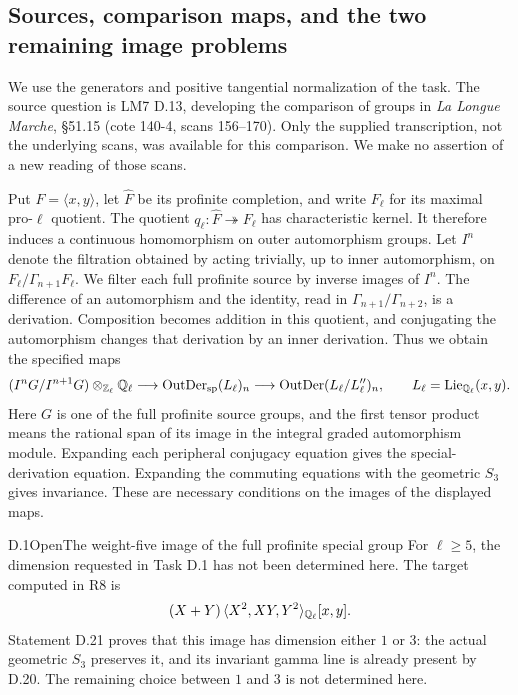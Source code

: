 \subsection{Sources, comparison maps, and the two remaining image problems}

We use the generators and positive tangential normalization of the task.
The source question is LM7 D.13, developing the comparison of groups in
\emph{La Longue Marche}, \S51.15 (cote 140-4, scans 156--170).
Only the supplied transcription, not the underlying scans, was available
for this comparison. We make no assertion of a new reading of those scans.

Put $F=\langle x,y\rangle$, let $\widehat F$ be its profinite completion,
and write $F_\ell$ for its maximal pro-$\ell$ quotient. The quotient
$q_\ell:\widehat F\twoheadrightarrow F_\ell$ has characteristic kernel.
It therefore induces a continuous homomorphism on outer automorphism
groups. Let $I^n$ denote the filtration obtained by acting trivially,
up to inner automorphism, on $F_\ell/\Gamma_{n+1}F_\ell$.
We filter each full profinite source by inverse images of $I^n$.
The difference of an automorphism and the identity, read in
$\Gamma_{n+1}/\Gamma_{n+2}$, is a derivation. Composition becomes addition
in this quotient, and conjugating the automorphism changes that
derivation by an inner derivation. Thus we obtain the specified maps
\[
 (I^nG/I^{n+1}G)\otimes_{\mathbb Z_\ell}\mathbb Q_\ell
 \longrightarrow \operatorname{OutDer}_{\mathrm{sp}}(L_\ell)_n
 \longrightarrow \operatorname{OutDer}(L_\ell/L_\ell'')_n,
 \qquad L_\ell=\operatorname{Lie}_{\mathbb Q_\ell}(x,y).
\]
Here $G$ is one of the full profinite source groups, and the first
tensor product means the rational span of its image in the integral
graded automorphism module. Expanding each peripheral conjugacy equation
gives the special-derivation equation. Expanding the commuting equations
with the geometric $S_3$ gives invariance. These are necessary conditions
on the images of the displayed maps.

\begin{statement}{D.1}{Open}{The weight-five image of the full profinite special group}
For $\ell\geq5$, the dimension requested in Task D.1 has not been
determined here. The target computed in R8 is
\[
 (X+Y)\,\langle X^2,XY,Y^2\rangle_{\mathbb Q_\ell}[x,y].
\]
Statement D.21 proves that this image has dimension either $1$ or $3$:
the actual geometric $S_3$ preserves it, and its invariant gamma line
is already present by D.20. The remaining choice between $1$ and $3$
is not determined here.
\end{statement}

